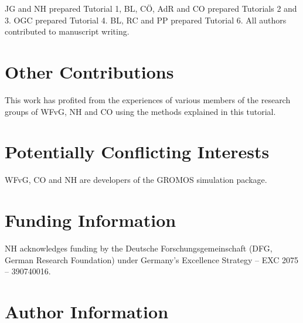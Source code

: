 \documentclass[9pt,tutorial,pubversion]{../includes/livecoms}
\newcommand{\githubrepository}{\url{https://github.com/hansenniels/gromos_tutorial_livecoms}}  %
\begin{document}
JG and NH prepared Tutorial 1, BL, C\"O, AdR and CO prepared Tutorials 2 and 3. OGC prepared Tutorial 4. BL, RC and PP prepared Tutorial 6. All authors contributed to manuscript writing.


\section{Other Contributions}

%
This work has profited from the experiences of various members of the research groups of  WFvG, NH and CO using the methods explained in this tutorial.


\section{Potentially Conflicting Interests}
WFvG, CO and NH are developers of the GROMOS simulation package.

\section{Funding Information}
NH acknowledges funding by the Deutsche Forschungsgemeinschaft (DFG, German Research Foundation) under Germany’s Excellence Strategy – EXC 2075 – 390740016.

\section*{Author Information}
\makeorcid




\end{document}
